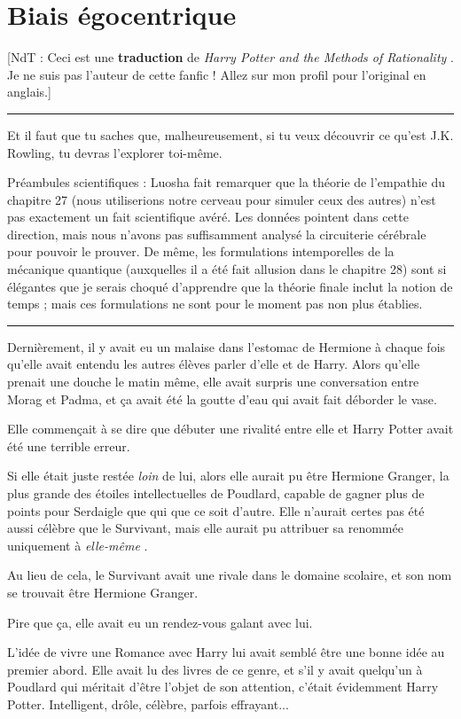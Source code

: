 
\chapter{Biais égocentrique}

[NdT : Ceci est une \textbf{traduction}  de \emph{Harry Potter and the Methods of Rationality} . Je ne suis pas l'auteur de cette fanfic ! Allez sur mon profil pour l'original en anglais.]
\par\noindent\rule{\textwidth}{0.4pt}
Et il faut que tu saches que, malheureusement, si tu veux découvrir ce qu'est J.K. Rowling, tu devras l'explorer toi-même.

Préambules scientifiques : Luosha fait remarquer que la théorie de l'empathie du chapitre 27 (nous utiliserions notre cerveau pour simuler ceux des autres) n'est pas exactement un fait scientifique avéré. Les données pointent dans cette direction, mais nous n'avons pas suffisamment analysé la circuiterie cérébrale pour pouvoir le prouver. De même, les formulations intemporelles de la mécanique quantique (auxquelles il a été fait allusion dans le chapitre 28) sont si élégantes que je serais choqué d'apprendre que la théorie finale inclut la notion de temps ; mais ces formulations ne sont pour le moment pas non plus établies.
\par\noindent\rule{\textwidth}{0.4pt}
Dernièrement, il y avait eu un malaise dans l'estomac de Hermione à chaque fois qu'elle avait entendu les autres élèves parler d'elle et de Harry. Alors qu'elle prenait une douche le matin même, elle avait surpris une conversation entre Morag et Padma, et ça avait été la goutte d'eau qui avait fait déborder le vase.

Elle commençait à se dire que débuter une rivalité entre elle et Harry Potter avait été une terrible erreur.

Si elle était juste restée \emph{loin}  de lui, alors elle aurait pu être Hermione Granger, la plus grande des étoiles intellectuelles de Poudlard, capable de gagner plus de points pour Serdaigle que qui que ce soit d'autre. Elle n'aurait certes pas été aussi célèbre que le Survivant, mais elle aurait pu attribuer sa renommée uniquement à \emph{elle-même} .

Au lieu de cela, le Survivant avait une rivale dans le domaine scolaire, et son nom se trouvait être Hermione Granger.

Pire que ça, elle avait eu un rendez-vous galant avec lui.

L'idée de vivre une Romance avec Harry lui avait semblé être une bonne idée au premier abord. Elle avait lu des livres de ce genre, et s'il y avait quelqu'un à Poudlard qui méritait d'être l'objet de son attention, c'était évidemment Harry Potter. Intelligent, drôle, célèbre, parfois effrayant...

